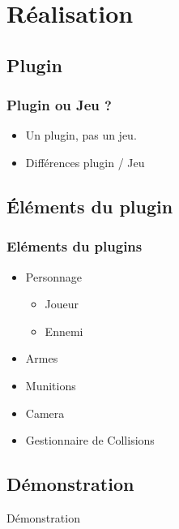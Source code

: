 \documentclass[12pt]{beamer}
\begin{document}
\section{Réalisation}
\subsection{Plugin}
\begin{frame}
\frametitle{Plugin ou Jeu ?}
\begin{itemize}
\item
Un plugin, pas un jeu.
\item
Différences plugin / Jeu
\end{itemize}
\end{frame}

\subsection{Éléments du plugin}
\begin{frame}[t]
\frametitle{Eléments du plugins}
\begin{itemize}
\item
Personnage
\begin{itemize}
\item
Joueur
\item
Ennemi
\end{itemize}
\item
Armes
\item
Munitions
\item
Camera
\item
Gestionnaire de Collisions

\end{itemize}

\end{frame}

\subsection{Démonstration}

{


\begin{frame}[c]
\begin{center}
\Huge Démonstration
\end{center}
\end{frame}
}
\end{document}
